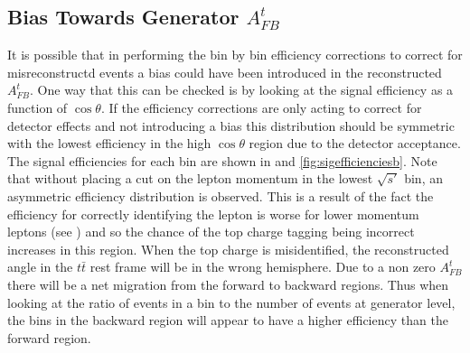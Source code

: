 \subsection{Bias Towards Generator $A_{FB}^t$}

It is possible that in performing the bin by bin efficiency corrections to correct for misreconstructd events a bias could have been introduced in the reconstructed $A_{FB}^t$. One way that this can be checked is by looking at the signal efficiency as a function of $\cos\theta$. If the efficiency corrections are only acting to correct for detector effects and not introducing a bias this distribution should be symmetric with the lowest efficiency in the high $\cos\theta$ region due to the detector acceptance. The signal efficiencies for each bin are shown in  and \ref{fig:sigefficienciesb}. Note that without placing a cut on the lepton momentum in the lowest $\sqrt{s'}$ bin, an asymmetric efficiency distribution is observed. This is a result of the fact the efficiency for correctly identifying the lepton is worse for lower momentum leptons (see ) and so the chance of the top charge tagging being incorrect increases in this region. When the top charge is misidentified, the reconstructed angle in the $t\bar{t}$ rest frame will be in the wrong hemisphere. Due to a non zero $A_{FB}^t$ there will be a net migration from the forward to backward regions. Thus when looking at the ratio of events in a bin to the number of events at generator level, the bins in the backward region will appear to have a higher efficiency than the forward region.

